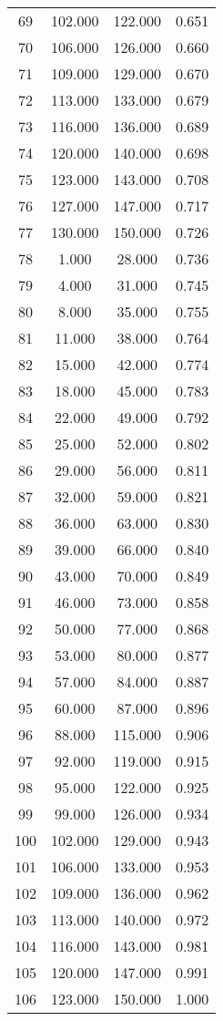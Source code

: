 \begin{tabular}{cccc}
  69 & 102.000 & 122.000 & 0.651 \\ 
  70 & 106.000 & 126.000 & 0.660 \\ 
  71 & 109.000 & 129.000 & 0.670 \\ 
  72 & 113.000 & 133.000 & 0.679 \\ 
  73 & 116.000 & 136.000 & 0.689 \\ 
  74 & 120.000 & 140.000 & 0.698 \\ 
  75 & 123.000 & 143.000 & 0.708 \\ 
  76 & 127.000 & 147.000 & 0.717 \\ 
  77 & 130.000 & 150.000 & 0.726 \\ 
  78 & 1.000 & 28.000 & 0.736 \\ 
  79 & 4.000 & 31.000 & 0.745 \\ 
  80 & 8.000 & 35.000 & 0.755 \\ 
  81 & 11.000 & 38.000 & 0.764 \\ 
  82 & 15.000 & 42.000 & 0.774 \\ 
  83 & 18.000 & 45.000 & 0.783 \\ 
  84 & 22.000 & 49.000 & 0.792 \\ 
  85 & 25.000 & 52.000 & 0.802 \\ 
  86 & 29.000 & 56.000 & 0.811 \\ 
  87 & 32.000 & 59.000 & 0.821 \\ 
  88 & 36.000 & 63.000 & 0.830 \\ 
  89 & 39.000 & 66.000 & 0.840 \\ 
  90 & 43.000 & 70.000 & 0.849 \\ 
  91 & 46.000 & 73.000 & 0.858 \\ 
  92 & 50.000 & 77.000 & 0.868 \\ 
  93 & 53.000 & 80.000 & 0.877 \\ 
  94 & 57.000 & 84.000 & 0.887 \\ 
  95 & 60.000 & 87.000 & 0.896 \\ 
  96 & 88.000 & 115.000 & 0.906 \\ 
  97 & 92.000 & 119.000 & 0.915 \\ 
  98 & 95.000 & 122.000 & 0.925 \\ 
  99 & 99.000 & 126.000 & 0.934 \\ 
  100 & 102.000 & 129.000 & 0.943 \\ 
  101 & 106.000 & 133.000 & 0.953 \\ 
  102 & 109.000 & 136.000 & 0.962 \\ 
  103 & 113.000 & 140.000 & 0.972 \\ 
  104 & 116.000 & 143.000 & 0.981 \\ 
  105 & 120.000 & 147.000 & 0.991 \\ 
  106 & 123.000 & 150.000 & 1.000 \\ 
   \hline
\end{tabular}
